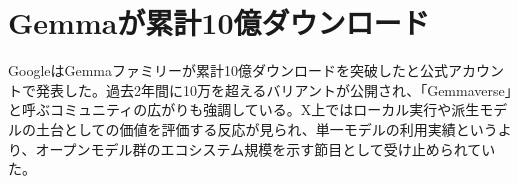 \section{Gemmaが累計10億ダウンロード}
GoogleはGemmaファミリーが累計10億ダウンロードを突破したと公式アカウントで発表した。過去2年間に10万を超えるバリアントが公開され、「Gemmaverse」と呼ぶコミュニティの広がりも強調している。X上ではローカル実行や派生モデルの土台としての価値を評価する反応が見られ、単一モデルの利用実績というより、オープンモデル群のエコシステム規模を示す節目として受け止められていた。
